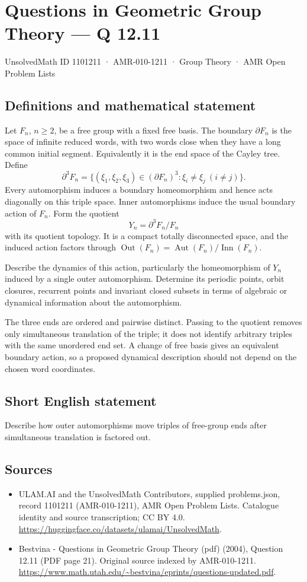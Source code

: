 \documentclass[11pt,a4paper]{article}
\begin{document}
\section*{Questions in Geometric Group Theory — Q 12.11}\label{1101211}
{\small UnsolvedMath ID 1101211 · AMR-010-1211 · Group Theory · AMR Open Problem Lists}
\subsection{Definitions and mathematical statement}
Let $F_n$, $n\geq2$, be a free group with a fixed free basis. The boundary $\partial F_n$ is the space of infinite reduced words, with two words close when they have a long common initial segment. Equivalently it is the end space of the Cayley tree. Define
\[
 \partial^3 F_n=\{(\xi_1,\xi_2,\xi_3)\in(\partial F_n)^3:
                                      \xi_i\ne\xi_j\ (i\ne j)\}.
\]
Every automorphism induces a boundary homeomorphism and hence acts diagonally on this triple space. Inner automorphisms induce the usual boundary action of $F_n$. Form the quotient
\[
 Y_n=\partial^3F_n/F_n
\]
with its quotient topology. It is a compact totally disconnected space, and the induced action factors through $\operatorname{Out}(F_n)=\operatorname{Aut}(F_n)/\operatorname{Inn}(F_n)$.

Describe the dynamics of this action, particularly the homeomorphism of $Y_n$ induced by a single outer automorphism. Determine its periodic points, orbit closures, recurrent points and invariant closed subsets in terms of algebraic or dynamical information about the automorphism.

The three ends are ordered and pairwise distinct. Passing to the quotient removes only simultaneous translation of the triple; it does not identify arbitrary triples with the same unordered end set. A change of free basis gives an equivalent boundary action, so a proposed dynamical description should not depend on the chosen word coordinates.
\subsection{Short English statement}
Describe how outer automorphisms move triples of free-group ends after simultaneous translation is factored out.
\subsection{Sources}
\begin{itemize}
\item[S1] ULAM.AI and the UnsolvedMath Contributors, supplied problems.json, record 1101211 (AMR-010-1211), AMR Open Problem Lists. Catalogue identity and source transcription; CC BY 4.0.
\url{https://huggingface.co/datasets/ulamai/UnsolvedMath}.
\item[S2] Bestvina - Questions in Geometric Group Theory (pdf) (2004), Question 12.11 (PDF page 21). Original source indexed by AMR-010-1211.
\url{https://www.math.utah.edu/~bestvina/eprints/questions-updated.pdf}.
\end{itemize}
\end{document}
